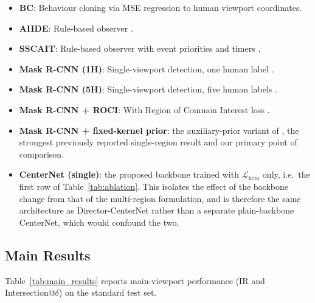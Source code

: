 \documentclass[preprint,12pt]{elsarticle}
\begin{document}
\begin{itemize}
  \item \textbf{BC}: Behaviour cloning via MSE regression to human viewport 
        coordinates.
  \item \textbf{AIIDE}: Rule-based observer \cite{mattsson2015automatic}.
  \item \textbf{SSCAIT}: Rule-based observer with event priorities and timers 
        \cite{mattsson2015automatic}.
  \item \textbf{Mask R-CNN (1H)}: Single-viewport detection, one human label 
        \cite{joo2023learning}.
  \item \textbf{Mask R-CNN (5H)}: Single-viewport detection, five human labels 
        \cite{joo2023learning}.
  \item \textbf{Mask R-CNN + ROCI}: With Region of Common Interest loss 
        \cite{joo2023learning}.
  \item \textbf{Mask R-CNN + fixed-kernel prior}: the auxiliary-prior variant
        of \cite{anonymous2025kbrs}, the strongest previously reported
        single-region result and our primary point of comparison.
  \item \textbf{CenterNet (single)}: the proposed backbone trained with
        $\mathcal{L}_{\text{hcm}}$ only, i.e.\ the first row of
        Table~\ref{tab:ablation}. This isolates the effect of the backbone
        change from that of the multi-region formulation, and is therefore
        the same architecture as Director-CenterNet rather than a separate
        plain-backbone CenterNet, which would confound the two.
\end{itemize}

\subsection{Main Results}

Table~\ref{tab:main_results} reports main-viewport performance (IR and 
Intersection@$\delta$) on the standard test set.
\end{document}

